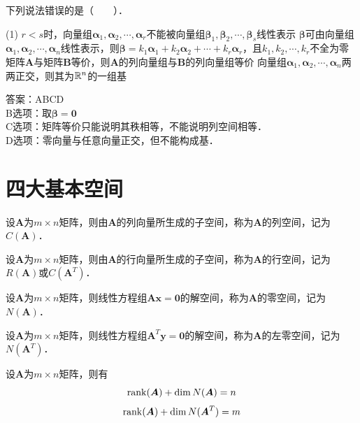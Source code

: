 \documentclass[12pt, a4paper, oneside, UTF8]{ctexbook}
\begin{document}
\begin{example}
    下列说法错误的是（　　）．
    \begin{tasks}[style = itemize,label = \Alph*.](1)
        \task $r<s$时，向量组$\bm{\alpha}_1, \bm{\alpha}_2, \cdots, \bm{\alpha}_r$不能被向量组$\bm{\beta}_1, \bm{\beta}_2, \cdots, \bm{\beta}_s$线性表示
        \task $\bm{\beta}$可由向量组$\bm{\alpha}_1, \bm{\alpha}_2, \cdots, \bm{\alpha}_n$线性表示，则$\bm{\beta}=k_1\bm{\alpha}_1 + k_2\bm{\alpha}_2 + \cdots + k_r\bm{\alpha}_r$，且$k_1,k_2,\cdots,k_r$不全为零
        \task 矩阵$\bm{A}$与矩阵$\bm{B}$等价，则$\bm{A}$的列向量组与$\bm{B}$的列向量组等价
        \task 向量组$\bm{\alpha}_1, \bm{\alpha}_2, \cdots, \bm{\alpha}_n$两两正交，则其为$\mathbb{R}^n$的一组基
    \end{tasks}
\end{example}
\begin{solution}
    答案：ABCD\\
    B选项：取$\bm{\beta} = \bm{0}$\\
    C选项：矩阵等价只能说明其秩相等，不能说明列空间相等．\\
    D选项：零向量与任意向量正交，但不能构成基．
\end{solution}
\section{四大基本空间}
\begin{definition}
    设$\bm{A}$为$m\times n$矩阵，则由$\bm{A}$的列向量所生成的子空间，称为$\bm{A}$的列空间，记为$C(\bm{A})$．
\end{definition}
\begin{definition}
    设$\bm{A}$为$m\times n$矩阵，则由$\bm{A}$的行向量所生成的子空间，称为$\bm{A}$的行空间，记为$R(\bm{A})$或$C(\bm{A}^T)$．
\end{definition}
\begin{definition}
    设$\bm{A}$为$m\times n$矩阵，则线性方程组$\bm{A}\bm{x}=\bm{0}$的解空间，称为$\bm{A}$的零空间，记为$N(\bm{A})$．
\end{definition}
\begin{definition}
    设$\bm{A}$为$m\times n$矩阵，则线性方程组$\bm{A}^T\bm{y}=\bm{0}$的解空间，称为$\bm{A}$的左零空间，记为$N(\bm{A}^T)$．
\end{definition}
\begin{theorem}[秩-零化度定理]
    设$\bm{A}$为$m\times n$矩阵，则有
    \[
        \mathrm{rank}(\bm{A}) + \operatorname{dim}N(\bm{A}) = n
    \]
    \[
        \mathrm{rank}(\bm{A}) + \operatorname{dim}N(\bm{A}^T) = m
    \]
\end{theorem}

\ifx\allfiles\undefined
\end{document}
